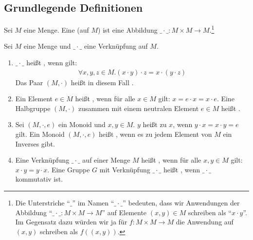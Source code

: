 
\subsection{Grundlegende Definitionen}

\begin{definition}
  Sei $M$ eine Menge. Eine  (auf \(M\)) ist eine Abbildung $\_\cdot\_:M\times M \to M$.\footnote{Die Unterstriche ``\(\_\)'' im Namen ``\(\_\cdot\_\)'' bedeuten, dass wir Anwendungen der Abbildung ``\(\_\cdot\_:M\times M\to M\)'' auf Elemente \((x,y)\in M\) schreiben als ``\(x\cdot y\)''. Im Gegensatz dazu würden wir ja für \(f:M\times M \to M\) die Anwendung auf \((x,y)\) schreiben als \(f((x,y))\).}
\end{definition}

\begin{definition}
  Sei \(M\) eine Menge und \(\_\cdot\_\) eine Verknüpfung auf \(M\).
  \begin{enumerate}
  \item $\_\cdot\_$ heißt , wenn gilt:
    \begin{align*}
      \forall x,y,z\in M. (x\cdot y)\cdot z = x\cdot (y\cdot z)
    \end{align*}
    Das Paar \((M,\cdot)\) heißt in diesem Fall .
  \item Ein Element $e\in M$ heißt , wenn für alle \(x\in M\) gilt: \(x=e\cdot x=x\cdot e\).
    Eine Halbgruppe $(M,\cdot)$ zusammen mit einem neutralen Element $e\in M$ heißt .
  \item Sei $(M,\cdot,e)$ ein Monoid und $x,y\in M$. $y$ heißt  zu $x$, wenn $y\cdot x=x\cdot y=e$ gilt.
    Ein Monoid $(M,\cdot,e)$ heißt , wenn es zu jedem Element von \(M\) ein Inverses gibt.
  \item Eine Verknüpfung \(\_\cdot\_\) auf einer Menge \(M\) heißt , wenn für alle \(x,y\in M\) gilt: \(x\cdot y=y\cdot x\).
    Eine Gruppe \(G\) mit Verknüpfung \(\_\cdot\_\) heißt , wenn \(\_\cdot\_\) kommutativ ist.
  \end{enumerate}
\end{definition}

